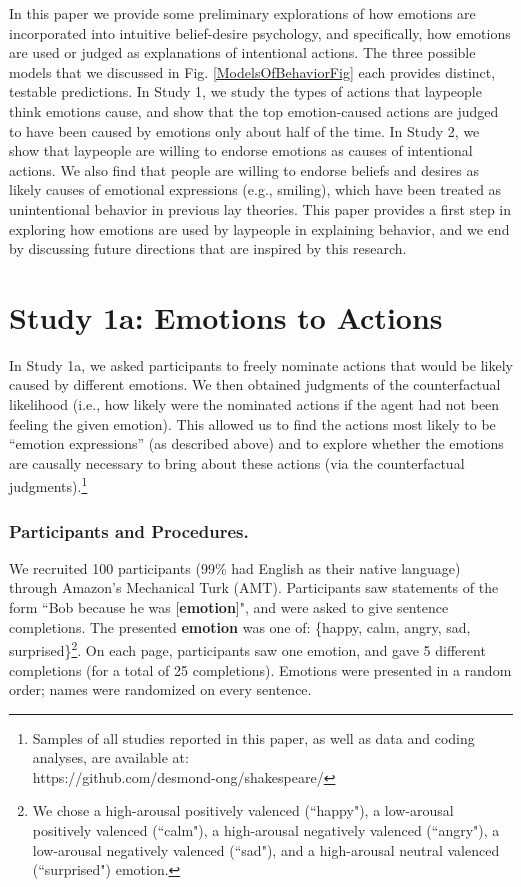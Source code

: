 \documentclass[10pt,letterpaper]{article}
\begin{document}
In this paper we provide some preliminary explorations of how emotions are incorporated into intuitive belief-desire psychology, and specifically, how emotions are used or judged as explanations of intentional actions. The three possible models that we discussed in Fig. \ref{ModelsOfBehaviorFig} each provides distinct, testable predictions. In Study 1, we study the types of actions that laypeople think emotions cause, and show that the top emotion-caused actions are judged to have been caused by emotions only about half of the time. In Study 2, we show that laypeople are willing to endorse emotions as causes of intentional actions. We also find that people are willing to endorse beliefs and desires as likely causes of emotional expressions (e.g., smiling), which have been treated as unintentional behavior in previous lay theories. This paper provides a first step in exploring how emotions are used by laypeople in explaining behavior, and we end by discussing future directions that are inspired by this research.



\section{Study 1a: Emotions to Actions}

	In Study 1a, we asked participants to freely nominate actions that would be likely caused by different emotions. 
	We then obtained judgments of the counterfactual likelihood (i.e., how likely were the nominated actions if the agent had not been feeling the given emotion). 
	This allowed us to find the actions most likely to be ``emotion expressions'' (as described above) %
and to explore whether the emotions are causally necessary to bring about these actions (via the counterfactual judgments).\footnote{Samples of all studies reported in this paper, as well as data and coding analyses, are available at: \\https://github.com/desmond-ong/shakespeare/}



\subsubsection{Participants and Procedures.} 
We recruited 100 participants (99\% had English as their native language) through Amazon's Mechanical Turk (AMT). Participants saw statements of the form ``Bob \underline{\hspace{2em}} because he was [\textbf{emotion}]", and were asked to give sentence completions. The presented \textbf{emotion} was one of: \{happy, calm, angry, sad, surprised\}\footnote{We chose a high-arousal positively valenced (``happy"), a low-arousal positively valenced (``calm"), a high-arousal negatively valenced (``angry"), a low-arousal negatively valenced (``sad"), and a high-arousal neutral valenced (``surprised") emotion.}. On each page, participants saw one emotion, and gave 5 different completions (for a total of 25 completions). Emotions were presented in a random order; names were randomized on every sentence.
\end{document}

